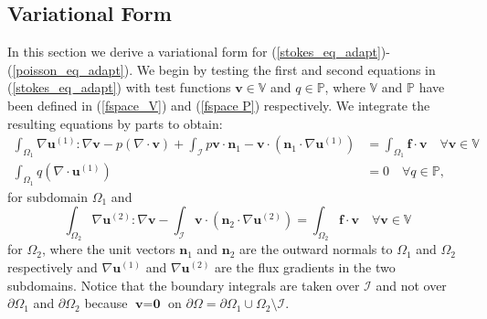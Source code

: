 \documentclass[12pt,a4paper]{article}
\theoremstyle{definition}
\begin{document}
\subsection{Variational Form}
In this section we derive a variational form for (\ref{stokes_eq_adapt})-(\ref{poisson_eq_adapt}).  We begin by testing the first and second equations in  (\ref{stokes_eq_adapt}) with test functions $\textbf{v}\in \mathbb{V}$ and $q\in \mathbb{P}$, where  $\mathbb{V}$ and $\mathbb{P}$ have been defined in (\ref{fspace_V}) and (\ref{fspace P}) respectively. We integrate the resulting equations by parts to obtain:
\begin{equation}\label{weak_stokes_1}
\begin{aligned}
\int_{\Omega_1}\nabla \textbf{u}^{\left(1\right)} : \nabla \textbf{v}-p\left(\nabla \cdot \textbf{v}\right) +\int_{\mathcal{I}} p\textbf{v}\cdot \textbf{n}_1-\textbf{v}\cdot\left(\textbf{n}_1\cdot\nabla\textbf{u}^{\left(1\right)}\right) &=\int_{\Omega_1}\textbf{f}\cdot \textbf{v}  \quad \forall  \textbf{v}\in \mathbb{V}\\
\int_{\Omega_1}q\left(\nabla \cdot \textbf{u}^{\left(1\right)}\right) &= 0\quad \forall q\in \mathbb{P},
\end{aligned}
\end{equation}
for subdomain $\Omega_1$ and
\begin{equation}\label{weak_poisson}
\int_{\Omega_2}\nabla \textbf{u}^{\left(2\right)} : \nabla \textbf{v} - \int_{\mathcal{I}} \textbf{v}\cdot\left(\textbf{n}_2\cdot\nabla\textbf{u}^{\left(2\right)}\right)= \int_{\Omega_2}\textbf{f}\cdot \textbf{v}  \quad \forall  \textbf{v}\in \mathbb{V}
\end{equation}
for $\Omega_2$, where the unit vectors $\textbf{n}_1$ and $\textbf{n}_2$ are the outward normals to $\Omega_{1}$ and $\Omega_{2}$ respectively and $\nabla \textbf{u}^{\left(1\right)}$ and $\nabla \textbf{u}^{\left(2\right)}$ are the flux gradients in the two subdomains. Notice that the boundary integrals are taken over $\mathcal{I}$ and not over $\partial \Omega_{1}$ and $\partial \Omega_{2}$ because $\textbf{v}=\textbf{0}$ on $ \partial \Omega = \partial \Omega_1\cup \Omega_{2}\setminus \mathcal{I}$.   
\end{document}
